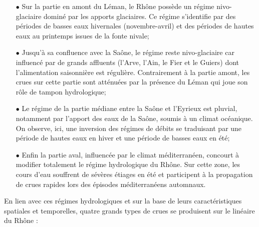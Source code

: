 \begin{itemize}
\item[$\bullet$] Sur la partie en amont du Léman, le Rhône possède un régime nivo-glaciaire dominé par les apports glaciaires. Ce régime s'identifie par des périodes de basses eaux hivernales (novembre-avril) et des périodes de hautes eaux au printemps issues de la fonte nivale;\\

\item[$\bullet$] Jusqu'à sa confluence avec la Saône, le régime reste nivo-glaciaire car influencé par de grands affluents (l'Arve, l'Ain, le Fier et le Guiers) dont l'alimentation saisonnière est régulière. Contrairement à la partie amont, les crues sur cette partie sont atténuées par la présence du Léman qui joue son rôle de tampon hydrologique;\\

\item[$\bullet$] Le régime de la partie médiane entre la Saône et l'Eyrieux est pluvial, notamment par l'apport des eaux de la Saône, soumis à un climat océanique. On observe, ici, une inversion des régimes de débits se traduisant par une période de hautes eaux en hiver et une période de basses eaux en été;\\

\item[$\bullet$] Enfin la partie aval, influencée par le climat méditerranéen, concourt à modifier totalement le régime hydrologique du Rhône. Sur cette zone, les cours d'eau souffrent de sévères étiages en été et participent à la propagation de crues rapides lors des épisodes méditerranéens automnaux.\\
\end{itemize}


En lien avec ces régimes hydrologiques et sur la base de leurs caractéristiques spatiales et temporelles, quatre grands types de crues se produisent sur le linéaire du Rhône :

